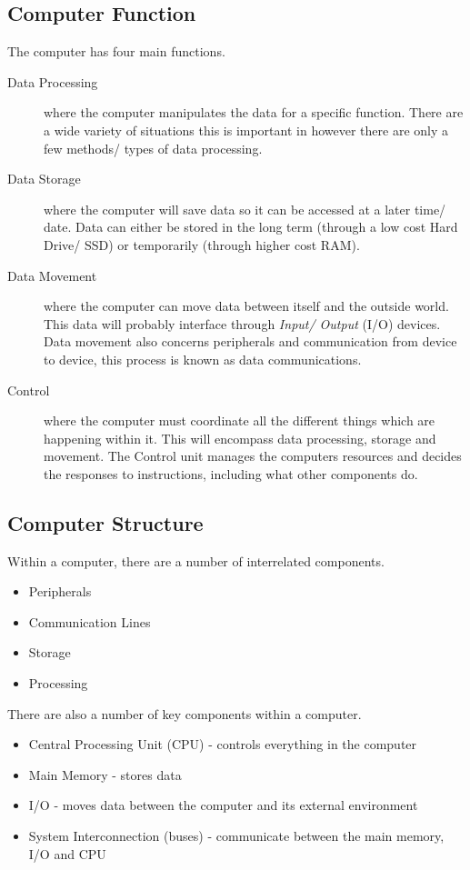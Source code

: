 \subsection*{Computer Function}
The computer has four main functions.
\begin{description}
    \item[Data Processing] where the computer manipulates the data for a specific function. There are a wide variety of situations this is important in however there are only a few methods/ types of data processing. 
    \item[Data Storage] where the computer will save data so it can be accessed at a later time/ date. Data can either be stored in the long term (through a low cost Hard Drive/ SSD) or temporarily (through higher cost RAM). 
    \item[Data Movement] where the computer can move data between itself and the outside world. This data will probably interface through \textit{Input/ Output} (I/O) devices. Data movement also concerns peripherals and communication from device to device, this process is known as data communications.
    \item[Control] where the computer must coordinate all the different things which are happening within it. This will encompass data processing, storage and movement. The Control unit manages the computers resources and decides the responses to instructions, including what other components do. 
\end{description}

\subsection*{Computer Structure}
Within a computer, there are a number of interrelated components.
\begin{itemize}
    \item Peripherals
    \item Communication Lines
    \item Storage
    \item Processing
\end{itemize}
There are also a number of key components within a computer.
\begin{itemize}
    \item Central Processing Unit (CPU) - controls everything in the computer
    \item Main Memory - stores data
    \item I/O - moves data between the computer and its external environment
    \item System Interconnection (buses) - communicate between the main memory, I/O and CPU
\end{itemize}

